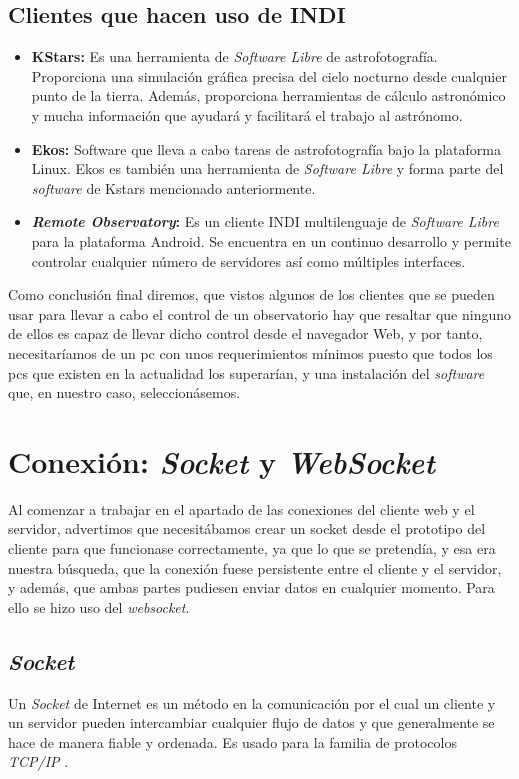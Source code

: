 \subsection{Clientes que hacen uso de INDI\cite{ClientesINDI}}
\begin{itemize}
  \item \textbf{KStars:} Es una herramienta de \textit{Software Libre} de astrofotografía. Proporciona una simulación gráfica precisa del cielo nocturno desde cualquier punto de la tierra. Además, proporciona herramientas de cálculo astronómico y mucha información que ayudará y facilitará el trabajo  al astrónomo.
  \item \textbf{Ekos:} Software que lleva a cabo tareas de astrofotografía bajo la plataforma Linux. Ekos es también una herramienta de \textit{Software Libre} y forma parte del \textit{software} de Kstars mencionado anteriormente.
  \item \textbf{\textit{Remote Observatory}:} Es un cliente INDI multilenguaje de \textit{Software Libre} para la plataforma Android. Se encuentra en un continuo desarrollo y permite controlar cualquier número de servidores así como múltiples interfaces.
\end{itemize}

Como conclusión final diremos, que vistos algunos de los clientes que se pueden usar para llevar a cabo el control de un observatorio hay que resaltar que ninguno de ellos es capaz de llevar dicho control desde el navegador Web, y por tanto, necesitaríamos de un pc con unos requerimientos mínimos puesto que todos los pcs que existen en la actualidad los superarían, y una instalación del \textit{software} que, en nuestro caso, seleccionásemos.

\section{Conexión: \textit{Socket} y \textit{WebSocket}}
Al comenzar a trabajar en el apartado de  las conexiones del cliente web y el servidor, advertimos  que necesitábamos  crear un socket desde el prototipo del cliente para que funcionase correctamente, ya que lo que se pretendía, y esa era nuestra búsqueda, que la conexión fuese persistente entre el cliente y el servidor, y además, que ambas partes pudiesen enviar datos en cualquier momento. Para ello se hizo uso del \textit{websocket}.

\subsection{\textit{Socket}}
Un \textit{Socket} de Internet es un método en la comunicación por el cual un cliente y un servidor pueden intercambiar cualquier flujo de datos y que generalmente se hace de manera fiable y ordenada. Es usado para la familia de protocolos \textit{TCP/IP} \cite{Socket}.

